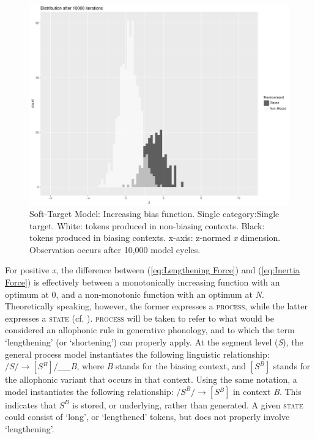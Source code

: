\begin{figure}[H]
\centering{}\includegraphics[scale=0.3]{figures/BaselineModel10000iter.pdf}\caption{\label{fig:Model2:LengtheningProcess}Soft-Target Model: Increasing
bias function. Single category:Single target. White: tokens produced
in non-biasing contexts. Black: tokens produced in biasing contexts.
x-axis: z-normed \emph{x} dimension. Observation occurs after 10,000
model cycles.}
\end{figure}

For positive \emph{x}, the difference between (\ref{eq:Lengthening Force})
and (\ref{eq:Inertia Force}) is effectively between a monotonically
increasing function with an optimum at 0, and a non-monotonic function
with an optimum at \emph{N}. Theoretically speaking, however, the
former expresses a \textsc{process}, while the latter expresses a
\textsc{state} (cf. \citealt{Hyman1975}). \textsc{process }will be
taken to refer to what would be considered an allophonic rule in generative
phonology, and to which the term `lengthening' (or `shortening') can
properly apply. At the segment level (\emph{S}), the general process
model instantiates the following linguistic relationship: $/S/\rightarrow[S{}^{B}]/$\emph{\_\_B}\textsc{,
}where\emph{ B} stands for the biasing context, and $[S^{B}]$ stands
for the allophonic variant that occurs in that context. Using the
same notation, a  model instantiates the following relationship:
$/S^{B}/\rightarrow[S{}^{B}]$ in context \emph{B}. This indicates
that $S^{B}$ is stored, or underlying, rather than generated. A given
\textsc{state} could consist of `long', or `lengthened' tokens, but
does not properly involve `lengthening'. 

